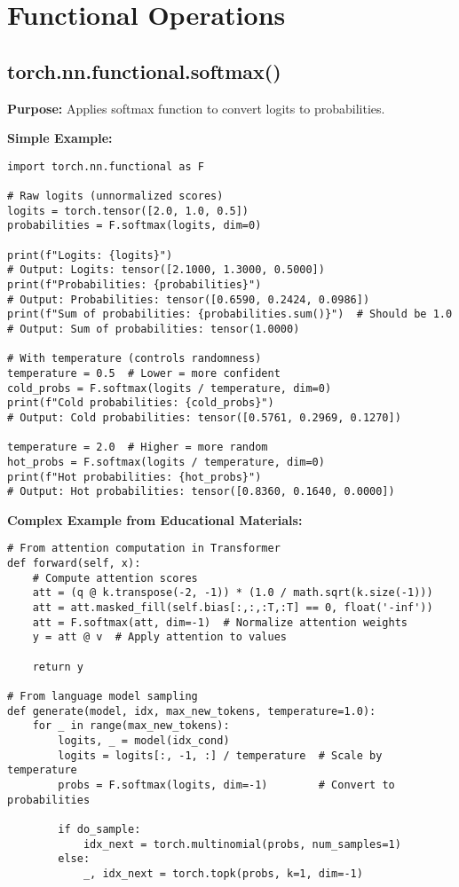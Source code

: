 \documentclass[11pt,a4paper]{book}
\begin{document}
\section{Functional Operations}

\subsection{torch.nn.functional.softmax()}

\textbf{Purpose:} Applies softmax function to convert logits to probabilities.

\textbf{Simple Example:}
\begin{verbatim}
import torch.nn.functional as F

# Raw logits (unnormalized scores)
logits = torch.tensor([2.0, 1.0, 0.5])
probabilities = F.softmax(logits, dim=0)

print(f"Logits: {logits}")
# Output: Logits: tensor([2.1000, 1.3000, 0.5000])
print(f"Probabilities: {probabilities}")
# Output: Probabilities: tensor([0.6590, 0.2424, 0.0986])
print(f"Sum of probabilities: {probabilities.sum()}")  # Should be 1.0
# Output: Sum of probabilities: tensor(1.0000)

# With temperature (controls randomness)
temperature = 0.5  # Lower = more confident
cold_probs = F.softmax(logits / temperature, dim=0)
print(f"Cold probabilities: {cold_probs}")
# Output: Cold probabilities: tensor([0.5761, 0.2969, 0.1270])

temperature = 2.0  # Higher = more random
hot_probs = F.softmax(logits / temperature, dim=0)
print(f"Hot probabilities: {hot_probs}")
# Output: Hot probabilities: tensor([0.8360, 0.1640, 0.0000])
\end{verbatim}

\textbf{Complex Example from Educational Materials:}
\begin{verbatim}
# From attention computation in Transformer
def forward(self, x):
    # Compute attention scores
    att = (q @ k.transpose(-2, -1)) * (1.0 / math.sqrt(k.size(-1)))
    att = att.masked_fill(self.bias[:,:,:T,:T] == 0, float('-inf'))
    att = F.softmax(att, dim=-1)  # Normalize attention weights
    y = att @ v  # Apply attention to values
    
    return y

# From language model sampling
def generate(model, idx, max_new_tokens, temperature=1.0):
    for _ in range(max_new_tokens):
        logits, _ = model(idx_cond)
        logits = logits[:, -1, :] / temperature  # Scale by temperature
        probs = F.softmax(logits, dim=-1)        # Convert to probabilities
        
        if do_sample:
            idx_next = torch.multinomial(probs, num_samples=1)
        else:
            _, idx_next = torch.topk(probs, k=1, dim=-1)
\end{verbatim}
\end{document}
